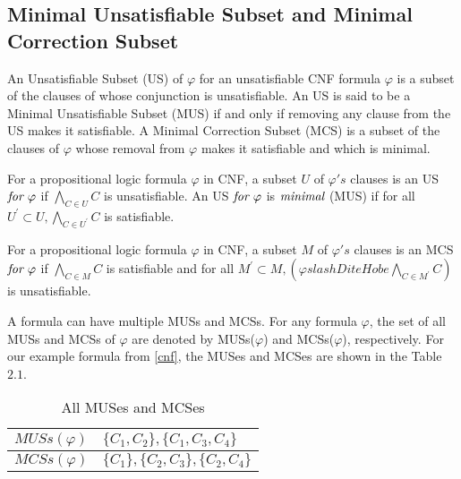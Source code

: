 \subsection{Minimal Unsatisfiable Subset and Minimal Correction Subset}
An Unsatisfiable Subset (US) of $\varphi$ for an unsatisfiable CNF formula $\varphi$ is a subset of the clauses of whose conjunction is unsatisfiable. An US is said to be a Minimal Unsatisfiable Subset (MUS) if and only if removing any clause from the US makes it satisfiable. A Minimal Correction Subset (MCS) is a subset of the clauses of $\varphi$ whose removal from $\varphi$ makes it satisfiable and which is minimal.
\begin{definition}[MUS]
	\label{def:mus}
	For a propositional logic formula $\varphi$ in CNF, a subset $U$ of $\varphi 's$ clauses is an US $\emph{for $\varphi$}$ if $\bigwedge \limits_{C\in U}C$ is unsatisfiable. An US $\emph{for $\varphi$}$ is $\emph{minimal}$ (MUS) if for all $U^{\prime}\subset U, \bigwedge \limits_{C\in U^{\prime}}C$ is satisfiable.
\end{definition}
\begin{definition}[MCS]
	\label{def:mcs}
	For a propositional logic formula $\varphi$ in CNF, a subset $M$ of $\varphi 's$ clauses is an MCS $\emph{for $\varphi$}$ if $\bigwedge \limits_{C \in M}C$ is satisfiable and for all $M^{\prime}\subset M, (\varphi slashDiteHobe \bigwedge \limits_{C\in M^{\prime}}C)$ is unsatisfiable.
\end{definition}
A formula can have multiple MUSs and MCSs. For any formula $\varphi$, the set of all MUSs and MCSs of $\varphi$ are denoted by MUSs($\varphi$) and MCSs($\varphi$), respectively.
For our example formula from \ref{cnf}, the MUSes and MCSes are shown in the Table $2.1$.
\begin{table}[]
	\centering
	\caption{All MUSes and MCSes}
	\label{my-label}
	\begin{tabular}{|l|l|}
		\hline
		$MUSs(\varphi)$ & $\{C_{1},C_{2}\},\{C_{1},C_{3},C_{4}\}$ \\ \hline
		$MCSs(\varphi)$ & $\{C_{1}\},\{C_{2},C_{3}\},\{C_{2},C_{4}\}$ \\ \hline
	\end{tabular}
\end{table}
